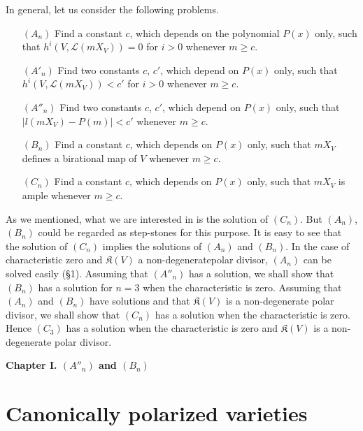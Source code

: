 In general, let us consider the following problems.
\begin{itemize}
\item[$(A_{n})$] Find a constant $c$, which depends on the polynomial $P(x)$ only, such that $h^{i}(V,\mathscr{L}(mX_{V}))=0$ for $i>0$ whenever $m\geq c$.

\item[$(A'_{n})$] Find two constants $c$, $c'$, which depend on $P(x)$ only, such that $h^{i}(V,\mathscr{L}(mX_{V}))<c'$ for $i>0$ whenever $m\geq c$.

\item[$(A''_{n})$] Find two constants $c$, $c'$, which depend on $P(x)$ only, such that $|l(mX_{V})-P(m)|<c'$ whenever $m\geq c$.

\item[$(B_{n})$] Find a constant $c$, which depends on $P(x)$ only, such that $mX_{V}$ defines a birational map of $V$ whenever $m\geq c$.

\item[$(C_{n})$] Find a constant $c$, which depends on $P(x)$ only, such that $mX_{V}$ is ample whenever $m\geq c$.
\end{itemize}
As we mentioned, what we are interested in is the solution of $(C_{n})$. But $(A_{n})$, $(B_{n})$ could be regarded as step-stones for this purpose. It is easy to see that the solution of $(C_{n})$ implies the solutions of $(A_{n})$ and $(B_{n})$. In the case of characteristic zero and $\mathfrak{K}(V)$ a non-degenerate\pageoriginale polar divisor, $(A_{n})$ can be solved easily (\S1). Assuming that $(A''_{n})$ has a solution, we shall show that $(B_{n})$ has a solution for $n=3$ when the characteristic is zero. Assuming that $(A_{n})$ and $(B_{n})$ have solutions and that $\mathfrak{K}(V)$ is a non-degenerate polar divisor, we shall show that $(C_{n})$ has a solution when the characteristic is zero. Hence $(C_{3})$ has a solution when the characteristic is zero and $\mathfrak{K}(V)$ is a non-degenerate polar divisor.

\bigskip

\begin{center}
{\Large\bf Chapter I. \boldmath$(A''_{n})$ and $(B_{n})$}
\end{center}

\section{Canonically polarized varieties}\label{art14-chap1-sec1}

